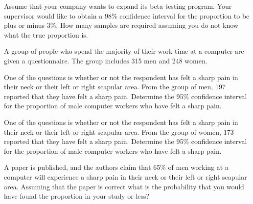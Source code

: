 \begin{problem}
\begin{subproblem}
      \vfill

    \item Assume that your company wants to expand its beta testing
      program. Your supervisor would like to obtain a 98\% confidence
      interval for the proportion to be plus or minus 3\%. How many
      samples are required assuming you do not know what the true
      proportion is.

      \vfill

    \end{subproblem}

\end{problem}



\begin{problem}

\item A group of people who spend the majority of their work time at a
  computer are given a questionnaire. The group includes 315 men and
  248 women.

  \begin{subproblem}
  \item One of the questions is whether or not the respondent has felt
    a sharp pain in their neck or their left or right scapular
    area. From the group of men, 197 reported that they have felt a
    sharp pain. Determine the 95\% confidence interval for the
    proportion of male computer workers who have felt a sharp pain.

    \vfill

  \item One of the questions is whether or not the respondent has felt
    a sharp pain in their neck or their left or right scapular
    area. From the group of women, 173 reported that they have felt a
    sharp pain. Determine the 95\% confidence interval for the
    proportion of male computer workers who have felt a sharp pain.

    \vfill

    \clearpage

  \item A paper is published, and the authors claim that 65\% of men
    working at a computer will experience a sharp pain in their neck
    or their left or right scapular area. Assuming that the paper is
    correct what is the probability that you would have found the
    proportion in your study or less?

    \vfill


\end{subproblem}
\end{problem}
